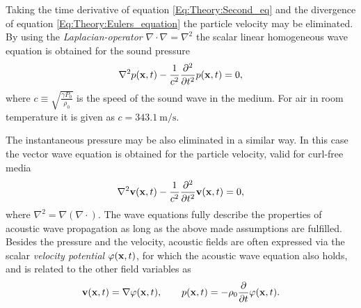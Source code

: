 %
Taking the time derivative of equation \ref{Eq:Theory:Second_eq} and the divergence of equation \ref{Eq:Theory:Eulers_equation} the particle velocity may be eliminated. By using the \emph{Laplacian-operator} $\nabla \cdot \nabla = \nabla^2$ the scalar linear homogeneous wave equation is obtained for the sound pressure
\begin{equation}
\nabla^2 p(\mathbf{x},t) - \frac{1}{c^2} \frac{\partial^2}{\partial t^2} p(\mathbf{x},t) = 0,
\label{Eq:Theory:Scalar_wave_equation}
\end{equation}
%
%
where $c \equiv \sqrt{ \frac{\gamma P_0}{\rho_0} }$ is the speed of the sound wave in the medium. For air in room temperature it is given as $c = 343.1 ~ \mathrm{m}/\mathrm{s}$.

The instantaneous pressure may be also eliminated in a similar way. In this case the vector wave equation is obtained for the particle velocity, valid for curl-free media
\begin{equation}
\nabla^2 \mathbf{v}(\mathbf{x},t) - \frac{1}{c^2} \frac{\partial^2}{\partial t^2} \mathbf{v}(\mathbf{x},t) = 0,
\label{Eq:Theory:Vector_wave_equation}
\end{equation}
where $\nabla^2 = \nabla \left( \nabla \cdot \right)$.
%
The wave equations fully describe the properties of acoustic wave propagation as long as the above made assumptions are fulfilled.
Besides the pressure and the velocity, acoustic fields are often expressed via the scalar \emph{velocity potential} $\varphi(\mathbf{x},t)$, for which the acoustic wave equation also holds, and is related to the other field variables as 
\begin{equation}
\mathbf{v}(\mathbf{x},t) = \nabla \varphi(\mathbf{x},t), \hspace{7mm} p(\mathbf{x},t) = -\rho_0 \frac{\partial}{\partial t} \varphi(\mathbf{x},t).
\label{eq:theory:velocity_potential_definition}
\end{equation}
%

